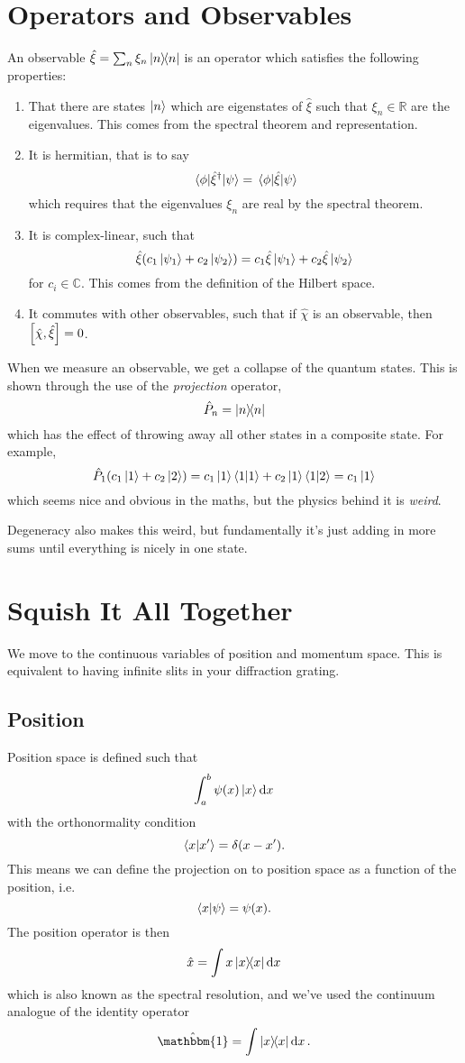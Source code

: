 \documentclass[]{scrreprt}
\begin{document}
\section{Operators and Observables}
An observable \(\hat\xi = \sum_n \xi_n \op{n}\) is an operator which satisfies the following properties:
\begin{enumerate}
  \item That there are states \(\ket{n}\) which are eigenstates of $\hat \xi$ such that $\xi_n \in \mathbb{R}$ are the eigenvalues.
  This comes from the spectral theorem and representation.
  \item It is hermitian, that is to say \[\mel{\phi}{\hat\xi^\dagger}{\psi} =\mel{\phi}{\hat\xi}{\psi}\] which requires that the eigenvalues $\xi_n$ are real by the spectral theorem.
  \item It is complex-linear, such that \[ \hat\xi(c_1 \ket{\psi_1} + c_2 \ket{\psi_2} ) = c_1\hat\xi \ket{\psi_1} + c_2\hat\xi \ket{\psi_2} \] for $c_i \in \mathbb{C}$. This comes from the definition of the Hilbert space.
  \item It commutes with other observables, such that if $\hat{\chi}$ is an observable, then $\commutator{\hat\chi}{\hat\xi}=0$.
\end{enumerate}

When we measure an observable, we get a collapse of the quantum states.
This is shown through the use of the \emph{projection} operator, \[\hat{P}_n = \ketbra{n}\] which has the effect of throwing away all other states in a composite state.
For example, \[ \hat{P}_1 (c_1\ket{1} + c_2\ket{2}) = c_1\ket{1}\braket{1} + c_2\ket{1}\bra{1}\ket{2} = c_1 \ket{1} \] which seems nice and obvious in the maths, but the physics behind it is \emph{weird}.

Degeneracy also makes this weird, but fundamentally it's just adding in more sums until everything is nicely in one state.

\section{Squish It All Together}
We move to the continuous variables of position and momentum space.
This is equivalent to having infinite slits in your diffraction grating.

\subsection{Position}
Position space is defined such that \[ \int_a^b \psi(x) \ket{x} \dd{x}\] with the orthonormality condition \[\braket{x}{x^\prime}=\delta(x-x^\prime). \]
This means we can define the projection on to position space as a function of the position, i.e.~\[\braket{x}{\psi} = \psi(x).\]
The position operator is then \[ \hat{x} = \int x \ketbra{x} \dd{x} \] which is also known as the spectral resolution, and we've used the continuum analogue of the identity operator
\[ \hat{\mathbbm{1}} = \int \ketbra{x}\dd{x}. \]
\end{document}
